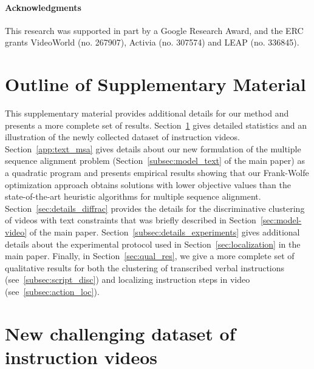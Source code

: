 \documentclass[10pt,twocolumn,letterpaper]{article}
\begin{document}
\small{
\paragraph{Acknowledgments}
This research was supported in part by a Google Research Award, and the ERC grants VideoWorld (no. 267907), Activia (no. 307574) and LEAP (no. 336845).
}




{\small


}











\clearpage

\appendix

\section*{Outline of Supplementary Material}
\label{app:intro}
This supplementary material provides additional details for our method and presents a more complete set of results.
Section~\ref{app:dataset} gives detailed statistics and an illustration of the newly collected dataset of instruction videos.
Section~\ref{app:text_msa} gives details about our new formulation of the multiple sequence alignment problem (Section~\ref{subsec:model_text} of the main paper) as a quadratic program and presents empirical results showing that our Frank-Wolfe optimization approach obtains solutions with lower objective values than the state-of-the-art heuristic algorithms for multiple sequence alignment. 
Section~\ref{sec:details_diffrac} provides the details for the discriminative clustering of videos with text constraints that was briefly described in Section~\ref{sec:model-video} of the main paper.
Section~\ref{subsec:details_experiments} gives additional details about the experimental protocol used in Section~\ref{sec:localization} in the main paper.
Finally, in Section~\ref{sec:qual_res}, we give a more complete set of qualitative results for both the clustering of transcribed verbal instructions (see~\ref{subsec:script_disc}) and localizing instruction steps in video (see~\ref{subsec:action_loc}).





\section{New challenging dataset of instruction videos}
\label{app:dataset}
\end{document}
